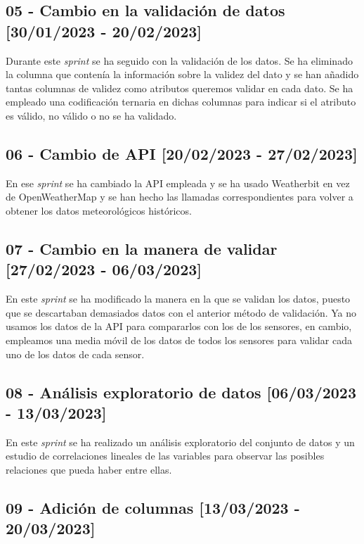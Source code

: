 \subsection{05 - Cambio en la validación de datos [30/01/2023 - 20/02/2023]}

Durante este \textit{sprint} se ha seguido con la validación de los datos. Se ha eliminado la columna que contenía la información sobre la validez del dato y se han añadido tantas columnas de validez como atributos queremos validar en cada dato. Se ha empleado una codificación ternaria en dichas columnas para indicar si el atributo es válido, no válido o no se ha validado.

\subsection{06 - Cambio de API [20/02/2023 - 27/02/2023]}

En ese \textit{sprint} se ha cambiado la API empleada y se ha usado Weatherbit en vez de OpenWeatherMap y se han hecho las llamadas correspondientes para volver a obtener los datos meteorológicos históricos.

\subsection{07 - Cambio en la manera de validar [27/02/2023 - 06/03/2023]}

En este \textit{sprint} se ha modificado la manera en la que se validan los datos, puesto que se descartaban demasiados datos con el anterior método de validación. Ya no usamos los datos de la API para compararlos con los de los sensores, en cambio, empleamos una media móvil de los datos de todos los sensores para validar cada uno de los datos de cada sensor.

\subsection{08 - Análisis exploratorio de datos [06/03/2023 - 13/03/2023]}

En este \textit{sprint} se ha realizado un análisis exploratorio del conjunto de datos y un estudio de correlaciones lineales de las variables para observar las posibles relaciones que pueda haber entre ellas.

\subsection{09 - Adición de columnas [13/03/2023 - 20/03/2023]}

